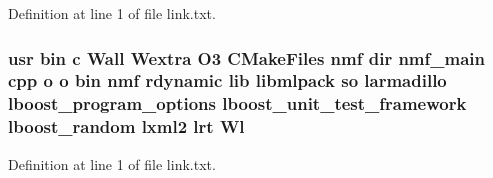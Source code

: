 Definition at line 1 of file link.\-txt.

\subsubsection[{Wl}]{\setlength{\rightskip}{0pt plus 5cm}usr bin c Wall Wextra O3 C\-Make\-Files nmf dir nmf\-\_\-main cpp o o bin nmf rdynamic lib libmlpack so larmadillo lboost\-\_\-program\-\_\-options lboost\-\_\-unit\-\_\-test\-\_\-framework lboost\-\_\-random lxml2 lrt Wl}\label{methods_2nmf_2CMakeFiles_2nmf_8dir_2link_8txt_a48bf1caaacb9576f8fd2438b0c5c8e22}


Definition at line 1 of file link.\-txt.

